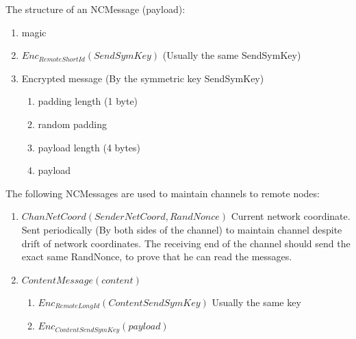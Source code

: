 \documentclass{amsart}
\theoremstyle{definition}
\theoremstyle{remark}
\numberwithin{equation}{section}
\begin{document}
The structure of an NCMessage (payload):
\begin{enumerate}
  \item magic
  \item $Enc_{RemoteShortId}(SendSymKey)$ (Usually the same SendSymKey)
  \item Encrypted message (By the symmetric key SendSymKey)
    \begin{enumerate}
      \item padding length (1 byte)
      \item random padding
      \item payload length (4 bytes)
      \item payload
    \end{enumerate}
\end{enumerate}

The following NCMessages are used to maintain channels to remote nodes:

\begin{enumerate}
  \item $ChanNetCoord(SenderNetCoord, RandNonce)$ Current network coordinate. Sent
    periodically (By both sides of the channel) to maintain channel despite
    drift of network coordinates. The receiving end of the channel should send
    the exact same RandNonce, to prove that he can read the messages.

  \item $ContentMessage(content)$
    \begin{enumerate}
      \item $Enc_{RemoteLongId}(ContentSendSymKey)$ Usually the same key
      \item $Enc_{ContentSendSymKey}(payload)$
    \end{enumerate}

\end{enumerate}


\end{document}
